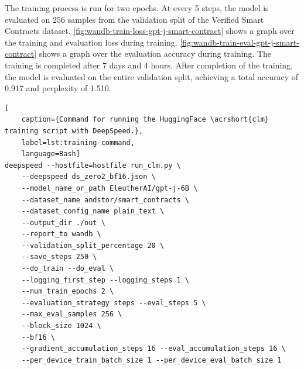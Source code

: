 The training process is run for two epochs. At every 5 steps, the model is evaluated on 256 samples from the validation split of the Verified Smart Contracts dataset. \cref{fig:wandb-train-loss-gpt-j-smart-contract} shows a graph over the training and evaluation loss during training. \cref{fig:wandb-train-eval-gpt-j-smart-contract} shows a graph over the evaluation accuracy during training. The training is completed after 7 days and 4 hours. After completion of the training, the model is evaluated on the entire validation split, achieving a total accuracy of 0.917 and perplexity of 1.510.

\begin{lstlisting}[
    caption={Command for running the HuggingFace \acrshort{clm} training script with DeepSpeed.},
    label=lst:training-command,
    language=Bash]
deepspeed --hostfile=hostfile run_clm.py \
    --deepspeed ds_zero2_bf16.json \
    --model_name_or_path EleutherAI/gpt-j-6B \
    --dataset_name andstor/smart_contracts \
    --dataset_config_name plain_text \
    --output_dir ./out \
    --report_to wandb \
    --validation_split_percentage 20 \
    --save_steps 250 \
    --do_train --do_eval \
    --logging_first_step --logging_steps 1 \
    --num_train_epochs 2 \
    --evaluation_strategy steps --eval_steps 5 \
    --max_eval_samples 256 \
    --block_size 1024 \
    --bf16 \
    --gradient_accumulation_steps 16 --eval_accumulation_steps 16 \
    --per_device_train_batch_size 1 --per_device_eval_batch_size 1
\end{lstlisting}

